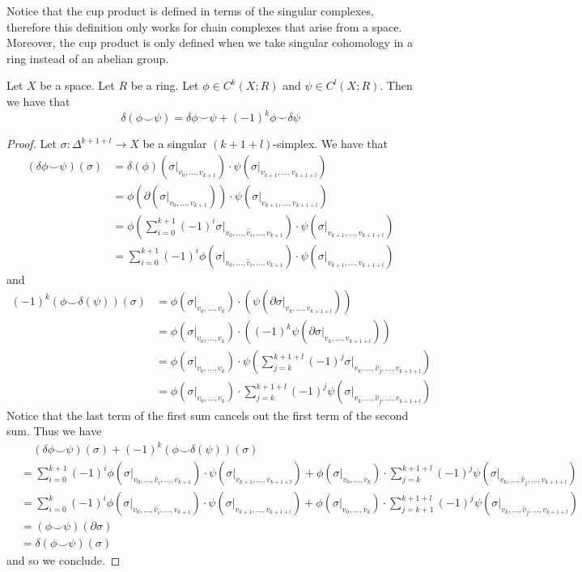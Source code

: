 \documentclass[a4paper]{article}
\begin{document}
Notice that the cup product is defined in terms of the singular complexes, therefore this definition only works for chain complexes that arise from a space. Moreover, the cup product is only defined when we take singular cohomology in a ring instead of an abelian group. 

\begin{lmm}{}{} Let $X$ be a space. Let $R$ be a ring. Let $\phi\in C^k(X;R)$ and $\psi\in C^l(X;R)$. Then we have that $$\delta(\phi\smile\psi)=\delta\phi\smile\psi+(-1)^k\phi\smile\delta\psi$$ \tcbline
\begin{proof}
Let $\sigma:\Delta^{k+1+l}\to X$ be a singular $(k+1+l)$-simplex. We have that 
\begin{align*}
(\delta\phi\smile\psi)(\sigma)&=\delta(\phi)(\sigma|_{v_0,\dots,v_{k+1}})\cdot\psi(\sigma|_{v_{k+1},\dots,v_{k+1+l}})\\
&=\phi(\partial(\sigma|_{v_0,\dots,v_{k+1}}))\cdot\psi(\sigma|_{v_{k+1},\dots,v_{k+1+l}})\\
&=\phi\left(\sum_{i=0}^{k+1}(-1)^i\sigma|_{v_0,\dots,\hat{v}_i,\dots,v_{k+1}}\right)\cdot\psi(\sigma|_{v_{k+1},\dots,v_{k+1+l}})\\
&=\sum_{i=0}^{k+1}(-1)^i\phi(\sigma|_{v_0,\dots,\hat{v}_i,\dots,v_{k+1}})\cdot\psi(\sigma|_{v_{k+1},\dots,v_{k+1+l}})
\end{align*}
and 
\begin{align*}
(-1)^k\left(\phi\smile\delta(\psi)\right)(\sigma)&=\phi(\sigma|_{v_0,\dots,v_k})\cdot(\psi(\partial\sigma|_{v_k,\dots,v_{k+1+l}}))\\
&=\phi(\sigma|_{v_0,\dots,v_k})\cdot((-1)^k\psi(\partial\sigma|_{v_k,\dots,v_{k+1+l}}))\\
&=\phi(\sigma|_{v_0,\dots,v_k})\cdot\psi\left(\sum_{j=k}^{k+1+l}(-1)^j\sigma|_{v_k,\dots,\hat{v}_j,\dots,v_{k+1+l}}\right)\\
&=\phi(\sigma|_{v_0,\dots,v_k})\cdot\sum_{j=k}^{k+1+l}(-1)^j\psi(\sigma|_{v_k,\dots,\hat{v}_j,\dots,v_{k+1+l}})
\end{align*}
Notice that the last term of the first sum cancels out the first term of the second sum. Thus we have 
\begin{align*}
&\;\;\;\;(\delta\phi\smile\psi)(\sigma)+(-1)^k\left(\phi\smile\delta(\psi)\right)(\sigma)\\
&=\sum_{i=0}^{k+1}(-1)^i\phi(\sigma|_{v_0,\dots,\hat{v}_i,\dots,v_{k+1}})\cdot\psi(\sigma|_{v_{k+1},\dots,v_{k+1+l}})+\phi(\sigma|_{v_0,\dots,v_k})\cdot\sum_{j=k}^{k+1+l}(-1)^j\psi(\sigma|_{v_k,\dots,\hat{v}_j,\dots,v_{k+1+l}})\\
&=\sum_{i=0}^k(-1)^i\phi(\sigma|_{v_0,\dots,\hat{v}_i,\dots,v_{k+1}})\cdot\psi(\sigma|_{v_{k+1},\dots,v_{k+1+l}})+\phi(\sigma|_{v_0,\dots,v_k})\cdot\sum_{j=k+1}^{k+1+l}(-1)^j\psi(\sigma|_{v_k,\dots,\hat{v}_j,\dots,v_{k+1+l}})\\
&=(\phi\smile\psi)(\partial\sigma)\\
&=\delta(\phi\smile\psi)(\sigma)
\end{align*}
and so we conclude. 
\end{proof}
\end{lmm}
\end{document}
